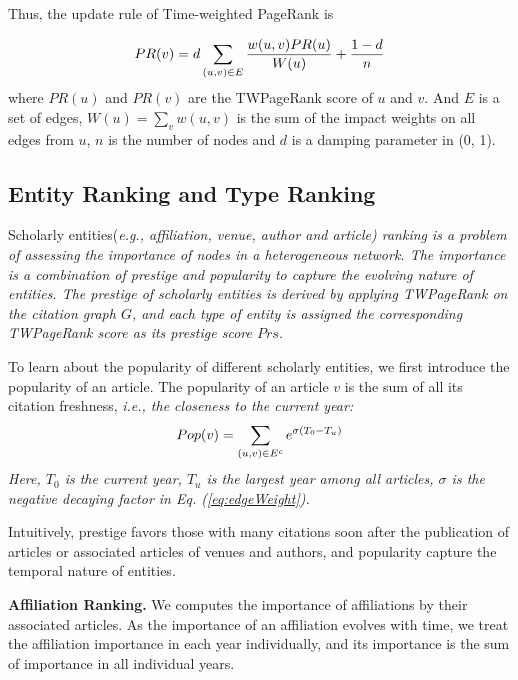 \par
Thus, the update rule of Time-weighted PageRank is

\begin{equation}
\centering
\label{eq:twPR}
PR(v)= d \sum_{(u,v)\in E} \frac{w(u,v)PR(u)}{W(u)} + \frac{1-d}{n}
\end{equation}
where $PR(u)$ and $PR(v)$ are the TWPageRank score of $u$ and $v$. And $E$ is a set of edges, $W(u)=\sum_v w(u,v)$ is the sum of the impact weights on all edges from $u$, $n$ is the number of nodes and $d$ is a damping parameter in (0, 1).


\subsection{Entity Ranking and Type Ranking}
\par
Scholarly entities(\itshape e.g., \upshape affiliation, venue, author and article) ranking is a problem of assessing the importance of nodes in a heterogeneous network. The importance is a combination of \itshape prestige \upshape and \itshape popularity \upshape to capture the evolving nature of entities. The prestige of scholarly entities is derived by applying TWPageRank on the citation graph $G$, and each type of entity is assigned the corresponding TWPageRank score as its prestige score $Prs$.

\par
To learn about the popularity of different scholarly entities, we first introduce the popularity of an article. The popularity of an article $v$ is the sum of all its citation freshness, \itshape i.e., \upshape the closeness to the current year:
\begin{equation}
\centering
\label{eq:pop}
Pop (v) = \sum_{(u,v) \in E^c} e^{\sigma(T_0 - T_u)}
\end{equation}
Here, $T_0$ is the current year, $T_u$ is the largest year among all articles, $\sigma$ is the negative decaying factor in Eq. (\ref{eq:edgeWeight}).

\par
Intuitively, prestige favors those with many citations soon after the publication of articles or associated articles of venues and authors, and popularity capture the temporal nature of entities.


\textbf{Affiliation Ranking.} We computes the importance of affiliations by their associated articles. As the importance of an affiliation evolves with time, we treat the affiliation importance in each year individually, and its importance is the sum of importance in all individual years.

